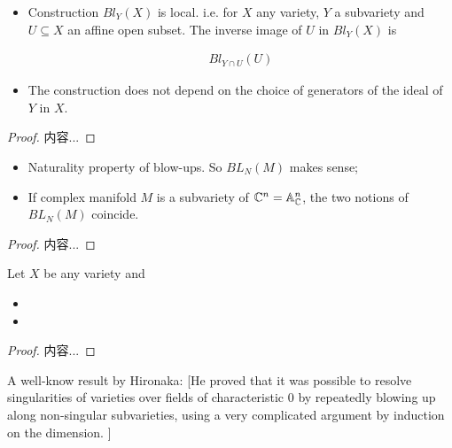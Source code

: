 \documentclass[Total.tex]{subfiles}
\begin{document}
		\begin{proposition}
			\begin{itemize}
				\item Construction $Bl_Y(X)$ is local. i.e. for $X$ any variety, $Y$ a subvariety and $U\subseteq X$ an affine open subset. The inverse image of $U$ in $Bl_Y(X)$ is 
				
				\begin{gather*}
					Bl_{Y\cap U}(U)
				\end{gather*}
				
				\item The construction does not depend on the choice of generators of the ideal of $Y$ in $X$.
			\end{itemize}
		\end{proposition}
		
		\begin{proof}
			内容...
		\end{proof}
		
		\begin{proposition}
			\begin{itemize}
				\item Naturality property of blow-ups. So $BL_N(M)$ makes sense;
				\item If complex manifold $M$ is a subvariety of $\mathbb{C}^n=\mathbb{A}^n_{\mathbb{C}}$, the two notions of $BL_N(M)$ coincide.
			\end{itemize}
		\end{proposition}
		
		\begin{proof}
			内容...
		\end{proof}
		
		\begin{theorem}
			Let $X$ be any variety and 
			
			\begin{itemize}
				\item 
				\item 
			\end{itemize}
		\end{theorem}
		
		\begin{proof}
			内容...
		\end{proof}
		
		A well-know result by Hironaka: [He proved that it was possible to resolve singularities of varieties over fields of characteristic 0 by repeatedly blowing up along non-singular subvarieties, using a very complicated argument by induction on the dimension. ]
		
\end{document}
